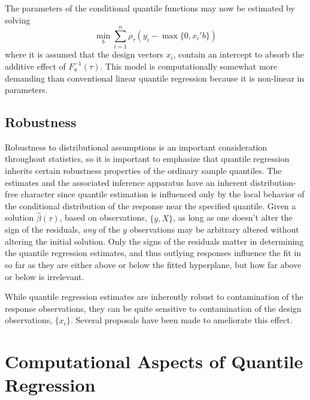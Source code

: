 \documentclass{amsart}
\begin{document}
The parameters of the conditional quantile functions may now be
estimated by solving
\begin{equation*}\label{e.cen2}
\min_b \sum_{i=1}^n \rho_\tau (y_i - \max \{ 0, x_i'b\})
\end{equation*}
where it is  assumed that the design vectors $x_i$,
contain an intercept to absorb the additive effect of $F_u^{-1}(\tau).$
This model is computationally somewhat more demanding than conventional
linear quantile regression because it is non-linear in parameters.

\subsection{Robustness}

Robustness to distributional assumptions is an important consideration
throughout statistics, so it is important to emphasize that
quantile regression inherits certain robustness properties  of the ordinary 
sample quantiles.  The estimates and the associated inference apparatus have
an inherent distribution-free character since quantile estimation is
influenced only by the local behavior of the conditional distribution
of the response near the specified quantile.  
Given a solution $\hat \beta (\tau)$, based on observations, $\{y,X\}$,
as long as one doesn't alter the sign of the residuals, {\em any} of the $y$
observations may be arbitrary altered without altering the initial solution.  
Only the signs of the residuals matter in determining the quantile regression
estimates, and thus outlying responses influence the fit in so far as
they are either above or below the fitted hyperplane, but how far above or
below is irrelevant.
 
While quantile regression estimates are inherently robust to
contamination of the response observations, they can be quite sensitive
to contamination of the design observations, $\{x_i\}$.  
Several proposals have been made to ameliorate this effect.

\section{Computational Aspects of Quantile Regression}
\end{document}
